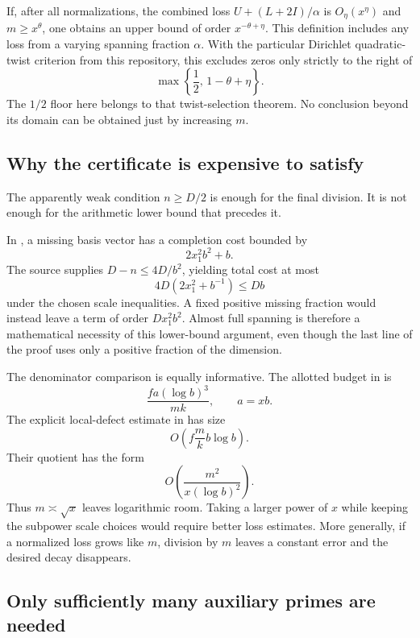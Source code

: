 If, after all normalizations, the combined loss \(U+(L+2I)/\alpha\) is \(O_\eta(x^\eta)\) and \(m\ge x^\theta\), one obtains an upper bound of order \(x^{-\theta+\eta}\). This definition includes any loss from a varying spanning fraction \(\alpha\). With the particular Dirichlet quadratic-twist criterion from this repository, this excludes zeros only strictly to the right of
\[
\max\left\{\frac12,\,1-\theta+\eta\right\}.
\]
The \(1/2\) floor here belongs to that twist-selection theorem. No conclusion beyond its domain can be obtained just by increasing \(m\).

\subsection{Why the certificate is expensive to satisfy}

The apparently weak condition \(n\ge D/2\) is enough for the final division. It is not enough for the arithmetic lower bound that precedes it.

In , a missing basis vector has a completion cost bounded by
\[
2x_1^2b^2+b.
\]
The source supplies \(D-n\le4D/b^2\), yielding total cost at most
\[
4D(2x_1^2+b^{-1})\le Db
\]
under the chosen scale inequalities. A fixed positive missing fraction would instead leave a term of order \(Dx_1^2b^2\). Almost full spanning is therefore a mathematical necessity of this lower-bound argument, even though the last line of the proof uses only a positive fraction of the dimension.

The denominator comparison is equally informative. The allotted budget in  is
\[
\frac{fa(\log b)^3}{mk},
\qquad a=xb.
\]
The explicit local-defect estimate in  has size
\[
O\!\left(f\frac{m}{k}b\log b\right).
\]
Their quotient has the form
\begin{equation}\label{eq:budget-ratio}
O\!\left(\frac{m^2}{x(\log b)^2}\right).
\end{equation}
Thus \(m\asymp\sqrt{x}\) leaves logarithmic room. Taking a larger power of \(x\) while keeping the subpower scale choices would require better loss estimates. More generally, if a normalized loss grows like \(m\), division by \(m\) leaves a constant error and the desired decay disappears.

\subsection{Only sufficiently many auxiliary primes are needed}\label{sec:subset}

